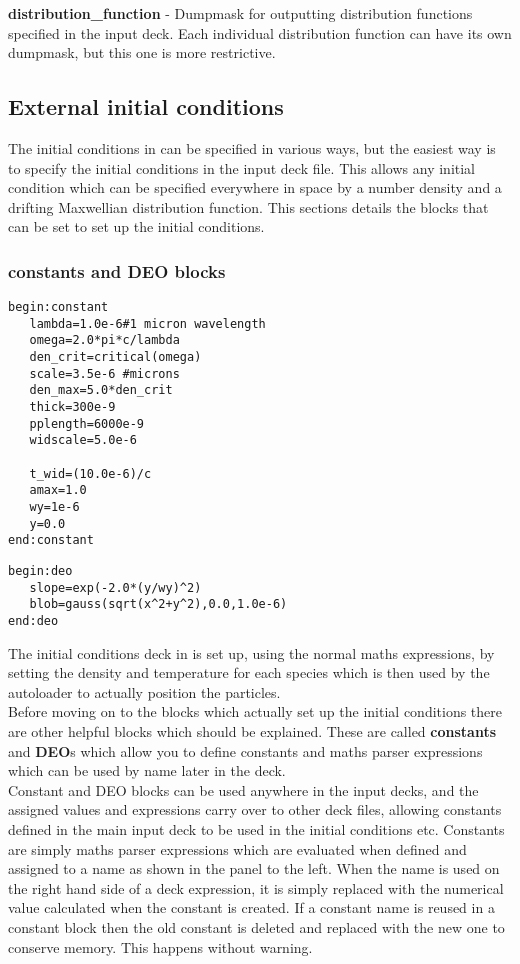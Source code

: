 \documentclass[12pt,a4paper]{article}
\newcommand{\emphtext}{\color{warwickdark} \fontfamily{phv}\selectfont\Large\bf}
\newcommand{\boxverbatim}[1]{\begin{Verbatim}[obeytabs=true,frame=single,
  framerule=0.5mm,rulecolor=\color{warwickmid},formatcom=\color{black},label=#1]}
\newcommand{\inlineemph}[1]{{\color{warwicklight} \bf{#1}}}
\newcommand{\EPOCH}{{\color{warwickdark}\fontfamily{phv}\selectfont{EPOCH}}}
\begin{document}
{\emphtext distribution\_function} - Dumpmask for outputting distribution
functions specified in the input deck. Each individual distribution function
can have its own dumpmask, but this one is more restrictive.\\

\subsection{External initial conditions}

The initial conditions in {\EPOCH} can be specified in various ways, but the
easiest way is to specify the initial conditions in the input deck file. This
allows any initial condition which can be specified everywhere in space by a
number density and a drifting Maxwellian distribution function. This sections
details the blocks that can be set to set up the initial conditions.

\subsubsection{\inlineemph{constants} and \inlineemph{DEO} blocks}

\boxverbatim{constant block}
begin:constant
   lambda=1.0e-6#1 micron wavelength
   omega=2.0*pi*c/lambda
   den_crit=critical(omega)
   scale=3.5e-6 #microns
   den_max=5.0*den_crit
   thick=300e-9
   pplength=6000e-9
   widscale=5.0e-6

   t_wid=(10.0e-6)/c
   amax=1.0
   wy=1e-6
   y=0.0
end:constant
\end{Verbatim}

\boxverbatim{deo block}
begin:deo
   slope=exp(-2.0*(y/wy)^2)
   blob=gauss(sqrt(x^2+y^2),0.0,1.0e-6)
end:deo
\end{Verbatim}

The initial conditions deck in {\EPOCH} is set up, using the normal maths
expressions, by setting the density and temperature for each species which is
then used by the autoloader to actually position the particles.\\

Before moving on to the blocks which actually set up the initial conditions
there are other helpful blocks which should be explained. These are called
\inlineemph{constants} and \inlineemph{DEO}s which allow you to define
constants and maths parser expressions which can be used by name later in the
deck.\\

Constant and DEO blocks can be used anywhere in the input decks, and the
assigned values and expressions carry over to other deck files, allowing
constants defined in the main input deck to be used in the initial conditions
etc. Constants are simply maths parser expressions which are evaluated when
defined and assigned to a name as shown in the panel to the left. When the name
is used on the right hand side of a deck expression, it is simply replaced with
the numerical value calculated when the constant is created.  If a constant
name is reused in a constant block then the old constant is deleted and
replaced with the new one to conserve memory. This happens without warning.\\
\end{document}
